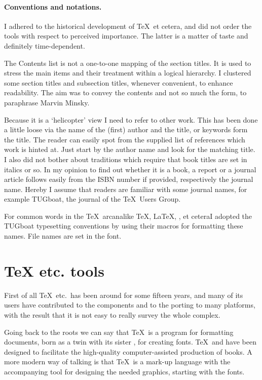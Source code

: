 \paragraph*{Conventions and notations.}
I adhered to the historical development of \TeX\ et cetera,
and did not order the tools with respect to perceived importance.
The latter is a matter of taste and definitely time-dependent.

The Contents list is not a one-to-one mapping of the section titles.
It is used to stress the main items and their treatment within a logical
hierarchy.
I clustered some section titles and subsection titles, whenever
convenient, to enhance readability.
The aim was to convey the contents and not so much the form,
to paraphrase Marvin Minsky.

Because it is a `helicopter' view I need to refer to other work.
This has been done a little loose via the name of the
(first) author and the title, or keywords form the title.
The reader can easily spot from the supplied list of references
which work is hinted at.
Just start by the author name and look for the matching title.
I also did not bother about traditions which require that book titles are set
in italics or so. In my opinion to find out whether it is a book, a report or
a journal article follows easily from the ISBN number if provided,
respectively the journal name.
Hereby I assume that readers are familiar with some
journal names, for example TUGboat, the journal of the \TeX\ Users Group.

For common words in the \TeX\ arcana\Dash like \TeX, \LaTeX,
\AMS, et cetera\Dash I adopted the TUGboat
typesetting conventions by using their macros for formatting these names.
File names are set in the  font.

\section{\TeX{} etc.{} tools}
First of all \TeX\ etc.\ has been around  for some  fifteen years,
and many of its users have contributed to the components
and to the porting to many platforms,
with the result that it is
not easy to really survey the whole complex.

Going back to the roots we can say that
\TeX\ is a program for formatting documents,
born as a twin with its sister \MF, for creating fonts.
\TeX\ and \MF{} have been designed to facilitate the
high-quality computer-assisted production of books.
A more modern way of talking is that \TeX\ is
a mark-up language with \MF{} the accompanying
tool for designing the needed graphics, starting with the fonts.

